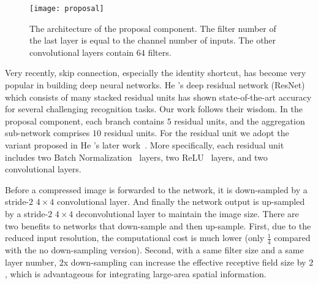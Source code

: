 \documentclass[10pt,twocolumn,letterpaper]{article}
\begin{document}
\begin{figure}[t]
\centering
\texttt{[image: proposal]}
\vspace{-1em}
\caption{The architecture of the proposal component. The filter number of the last layer is equal to the channel number of inputs. The other convolutional layers contain $64$ filters. }
\vspace{-1em}
\label{fig:proposal}
\end{figure}

Very recently, skip connection, especially the identity shortcut, has become very popular in building deep neural networks. He \etal's deep residual network (ResNet)~\cite{resnet} which consists of many stacked residual units has shown state-of-the-art accuracy for several challenging recognition tasks. Our work follows their wisdom. In the proposal component, each branch contains $5$ residual units, and the aggregation sub-network comprises $10$ residual units. For the residual unit we adopt the variant proposed in He \etal's later work~\cite{identity_mappings}. More specifically, each residual unit includes two Batch Normalization~\cite{batch_normalization} layers, two ReLU~\cite{alexnet} layers, and two convolutional layers.

Before a compressed image is forwarded to the network, it is down-sampled by a stride-$2$ $4\times4$ convolutional layer. And finally the network output is up-sampled by a stride-$2$ $4\times4$ deconvolutional layer to maintain the image size. There are two benefits to networks that down-sample and then up-sample. First, due to the reduced input resolution, the computational cost is much lower (only $\frac{1}{4}$ compared with the no down-sampling version). Second, with a same filter size and a same layer number, $2$x down-sampling can increase the effective receptive field size by $2$, which is advantageous for integrating large-area spatial information.
\end{document}
